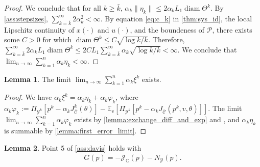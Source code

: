\documentclass[journal,twoside,web,final]{ieeecolor}
\theoremstyle{definition}
\newtheorem{lemma}{Lemma}
\newcommand{\J}{\mathcal{J}}
\newcommand{\E}{\mathbb{E}}
\newcommand{\C}{\mathbb{C}}
\newcommand{\Cb}{{\bar{\mathcal{C}}}}
\begin{document}
\begin{proof}
We conclude that for all $k \geq \bar{k}$, $\alpha_k \|\eta_k\| \leq 2 \alpha_k L_1 \operatorname*{diam}\Theta^k$. By \cref{ass:stepsizes}, $\sum_{k=\bar{k}}^{\infty} 2 \alpha_k^2 < \infty$. 
By equation \cref{eq:c_k} in \cref{thm:sys_id}, the local Lipschitz continuity of $x(\cdot)$ and $u(\cdot)$, 
and the boundeness of $\mathcal{P}$, 
there exists some $C>0$ for which $\operatorname*{diam}\Theta^k \leq C \sqrt{\log k / k} $. 
Therefore, $\sum_{k=\bar{k}}^{\infty} 2 \alpha_k L_1 \operatorname*{diam}\Theta^k \leq 2C L_1 \sum_{k=\bar{k}}^{\infty} \alpha_k \sqrt{\log k / k} < \infty$. 
We conclude that $\lim_{n \to \infty} \sum_{k=1}^{n} \alpha_k \eta_k < \infty$.
\end{proof}

\begin{lemma}\label{lemma:second_error_limit}
The limit $\displaystyle \lim_{n \to \infty} \sum_{k=1}^{n} \alpha_k \xi^k$ exists.
\end{lemma}
%
\begin{proof}
We have $\alpha_k \xi^k = \alpha_k \eta_k + \alpha_k \varphi_k$, where $\alpha_k \varphi_k := \Pi_{\mathcal{Y}^k}[p^k-\alpha_k J_\Cb^k(\theta)] - \E_v[\Pi_{\mathcal{Y}^k}[p^k-\alpha_k J_\Cb(p^k,v,\theta)]]$. The limit $\lim_{n \to \infty} \sum_{k=1}^{n} \alpha_k \varphi_k$ exists by \cref{lemma:exchange_diff_and_exp} and \cite[Lemma A.5]{davis2020stochastic}, and $\alpha_k \eta_k$ is summable by \cref{lemma:first_error_limit}.
\end{proof}
%
\begin{lemma}\label{lemma:point_5_davis}
Point 5 of \cref{ass:davis} holds with
\begin{align*}
G(p) = -\J_\C (p) - N_{\mathcal{Y}}(p).
\end{align*}
\end{lemma}
%
\end{document}
